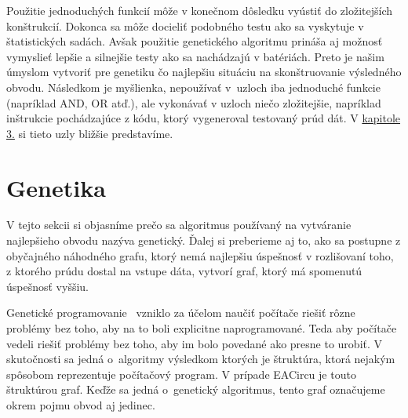 Použitie jednoduchých funkcií môže v konečnom dôsledku vyústiť do zložitejších konštrukcií. Dokonca sa môže docieliť podobného testu ako sa vyskytuje v štatistických sadách. Avšak použitie genetického algoritmu prináša aj možnosť vymyslieť lepšie a silnejšie testy ako sa nachádzajú v batériách. Preto je našim úmyslom vytvoriť pre genetiku čo najlepšiu situáciu na skonštruovanie výsledného obvodu. Následkom je myšlienka, nepoužívať v~uzloch iba jednoduché funkcie (napríklad AND, OR atď.), ale vykonávať v uzloch niečo zložitejšie, napríklad inštrukcie pochádzajúce z kódu, ktorý vygeneroval testovaný prúd dát. V \hyperref[chap:eacirc-jvmsim]{kapitole 3.} si tieto uzly bližšie predstavíme.


\section{Genetika}
\label{sec:genetics}

V tejto sekcii si objasníme prečo sa algoritmus používaný na vytváranie najlepšieho obvodu nazýva genetický. Ďalej si preberieme aj to, ako sa postupne z obyčajného náhodného grafu, ktorý nemá najlepšiu úspešnosť v rozlišovaní toho, z ktorého prúdu dostal na vstupe dáta, vytvorí graf, ktorý má spomenutú úspešnosť vyššiu.

{Genetické programovanie}~\cite{koza1992genetic} vzniklo za účelom naučiť počítače riešiť rôzne problémy bez toho, aby na to boli explicitne naprogramované. Teda aby počítače vedeli riešiť problémy bez toho, aby im bolo povedané ako presne to urobiť. V skutočnosti sa jedná o~algoritmy výsledkom ktorých je štruktúra, ktorá nejakým spôsobom reprezentuje počítačový program. V prípade EACircu je touto štruktúrou graf. Keďže sa jedná o~genetický algoritmus, tento graf označujeme okrem pojmu obvod aj jedinec. 

